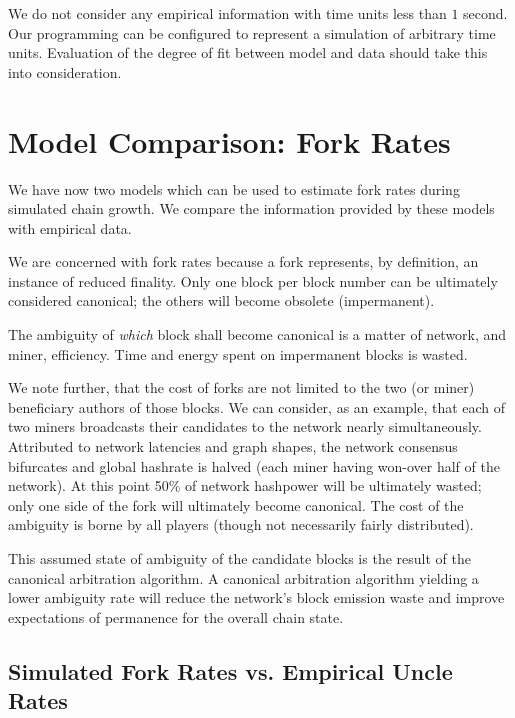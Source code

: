 \documentclass[11pt]{article}
\theoremstyle{plain}
\begin{document}
We do not consider any empirical information with time units less than $1$
second. Our programming can be configured to represent a simulation of
arbitrary time units. Evaluation of the degree of fit between model and
data should take this into consideration.


\section{\normalsize{Model Comparison: Fork Rates}}

We have now two models which can be used to estimate fork rates during
simulated chain growth. We compare the information provided by these models with
empirical data.

We are concerned with fork rates because a fork represents, by definition, an
instance of reduced finality. Only one block per block number can be ultimately
considered canonical; the others will become obsolete (impermanent).

The ambiguity of \emph{which} block shall become canonical is a matter of
network, and miner, efficiency. Time and energy spent on impermanent blocks is 
wasted.

We note further, that the cost of forks are not limited to the two (or miner)
beneficiary authors of those blocks. We can consider, as an example, that each
of two miners broadcasts their candidates to the network nearly simultaneously.
Attributed to network latencies and graph shapes, the network consensus bifurcates
and global hashrate is halved (each miner having won-over half of the network).
At this point 50\% of network hashpower will be ultimately wasted; only one
side of the fork will ultimately become canonical. The cost of the ambiguity is
borne by all players (though not necessarily fairly distributed).

This assumed state of ambiguity of the candidate blocks is the result of the
canonical arbitration algorithm. A canonical arbitration algorithm yielding a
lower ambiguity rate will reduce the network's block emission waste and improve
expectations of permanence for the overall chain state.

\subsection{\normalsize{Simulated Fork Rates vs. Empirical Uncle Rates}}
\end{document}
